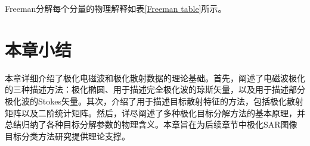 Freeman分解每个分量的物理解释如表\ref{Freeman table}所示。
\begin{table}[!ht]
  \caption{Freeman分解}
  \label{Freeman table}
\end{table}

\section{本章小结}
本章详细介绍了极化电磁波和极化散射数据的理论基础。首先，阐述了电磁波极化的三种描述方法：极化椭圆、用于描述完全极化波的琼斯矢量，以及用于描述部分极化波的Stokes矢量。其次，介绍了用于描述目标散射特征的方法，包括极化散射矩阵以及二阶统计矩阵。然后，详尽阐述了多种极化目标分解方法的基本原理，并总结归纳了各种目标分解参数的物理含义。本章旨在为后续章节中极化SAR图像目标分类方法研究提供理论支撑。